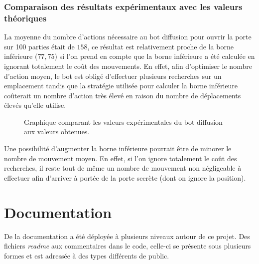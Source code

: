 \documentclass[a4paper,12pt]{article}
\begin{document}
\subsubsection{Comparaison des résultats expérimentaux avec les valeurs
  théoriques}
La moyenne du nombre d'actions nécessaire au bot diffusion pour ouvrir la porte
sur 100 parties était de $158$, ce résultat est relativement proche de la borne
inférieure ($77,75$) si l'on prend en compte que la borne inférieure a été
calculée en ignorant totalement le coût des mouvements. En effet, afin
d'optimiser le nombre d'action moyen, le bot est obligé d'effectuer plusieurs
recherches sur un emplacement tandis que la stratégie utilisée pour calculer la
borne inférieure coûterait un nombre d'action très élevé en raison du nombre de
déplacements élevés qu'elle utilise.
\begin{figure}[H]
	\caption{\label{fig:compare} Graphique comparant les valeurs expérimentales du
  bot diffusion aux valeurs obtenues.}
\end{figure}

Une possibilité d'augmenter la borne inférieure pourrait être de minorer le
nombre de mouvement moyen. En effet, si l'on ignore totalement le coût des
recherches, il reste tout de même un nombre de mouvement non négligeable à
effectuer afin d'arriver à portée de la porte secrète (dont on ignore la
position).

\section{Documentation}
De la documentation a été déployée à plusieurs niveaux autour de ce projet.
Des fichiers {\em readme} aux commentaires dans le code, celle-ci se présente
sous plusieurs formes et est adressée à des types différents de public.
\end{document}
